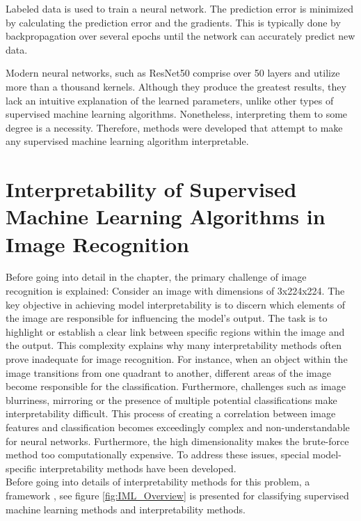Labeled data is used to train a neural network. The prediction error is minimized by calculating the prediction error and the gradients. This is typically done by backpropagation over several epochs until the network can accurately predict new data.

Modern neural networks, such as ResNet50 \cite{he2015deep} comprise over 50 layers and utilize more than a thousand kernels. Although they produce the greatest results, they lack an intuitive explanation of the learned parameters, unlike other types of supervised machine learning algorithms. Nonetheless, interpreting them to some degree is a necessity. Therefore, methods were developed that attempt to make any supervised machine learning algorithm interpretable. 

\chapter{Interpretability of Supervised Machine Learning Algorithms in Image Recognition}
\label{sec:IoNN}

Before going into detail in the chapter, the primary challenge of image recognition is explained: Consider an image with dimensions of 3x224x224. The key objective in achieving model interpretability is to discern which elements of the image are responsible for influencing the model's output. The task is to highlight or establish a clear link between specific regions within the image and the output. This complexity explains why many interpretability methods often prove inadequate for image recognition. For instance, when an object within the image transitions from one quadrant to another, different areas of the image become responsible for the classification. Furthermore, challenges such as image blurriness, mirroring or the presence of multiple potential classifications make interpretability difficult. This process of creating a correlation between image features and classification becomes exceedingly complex and non-understandable for neural networks. Furthermore, the high dimensionality makes the brute-force method too computationally expensive. To address these issues, special model-specific interpretability methods have been developed.\\

Before going into details of interpretability methods for this problem, a framework \cite{allen2023interpretable}, see figure \ref{fig:IML_Overview} is presented for classifying supervised machine learning methods and interpretability methods.

